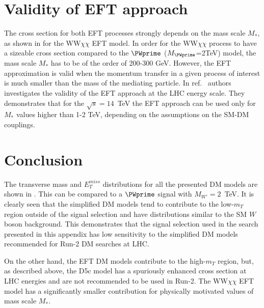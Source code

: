 





\section{Validity of EFT approach}

The cross section for both EFT processes strongly depends on the mass scale $M_{*}$,
as shown in  for the WW$\chi\chi$ EFT model.
In order for the WW$\chi\chi$ process to have a sizeable cross section compared to the $\PWprime$ ($M_{\PWprime}$=2TeV) model, 
the mass scale $M_{*}$ has to be of the order of 200-300 GeV. 
However, the EFT approximation is valid when the momentum transfer in a given
process of interest is much smaller than the mass of the mediating
particle. 
In ref.~\cite{eft_validity_limits} authors investigates the validity of the EFT approach at
the LHC energy scale. They demonstrates that for the $\sqrt{s} = 14$~TeV the 
EFT approach can be used only for $M_{*}$ values higher than 1-2 TeV, depending on the assumptions on the SM-DM couplings.

\section{Conclusion}

The transverse mass and $E_{T}^{miss}$ distributions for all the presented DM models are shown in . This can be compared to a $\PWprime$ signal with $M_{W'} = 2$~TeV.
It is clearly seen that the simplified DM models tend to contribute to the low-$m_{T}$ region
outside of the signal selection and have distributions similar to the SM $W$ boson background.
This demonstrates that the signal selection used in the search presented in this appendix 
has low sensitivity to the simplified DM models recommended for Run-2 DM searches at LHC.

On the other hand, the EFT DM models contribute to the high-$m_{T}$ region, but, as described above, the D5c model has a spuriously enhanced cross section at LHC energies and are not recommended to be used in Run-2. The WW$\chi\chi$ EFT model has a significantly smaller contribution for physically motivated values of mass scale $M_{*}$.


